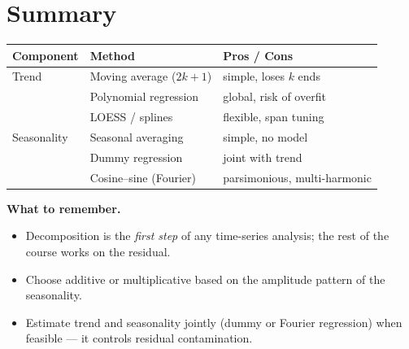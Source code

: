 \section*{Summary}

\begin{center}
\begin{tabular}{lll}
\toprule
\textbf{Component} & \textbf{Method} & \textbf{Pros / Cons} \\
\midrule
Trend       & Moving average ($2k+1$)      & simple, loses $k$ ends \\
            & Polynomial regression        & global, risk of overfit \\
            & LOESS / splines              & flexible, span tuning \\
\midrule
Seasonality & Seasonal averaging           & simple, no model \\
            & Dummy regression             & joint with trend \\
            & Cosine--sine (Fourier)       & parsimonious, multi-harmonic \\
\bottomrule
\end{tabular}
\end{center}

\medskip
\noindent\textbf{What to remember.}
\begin{itemize}
  \item Decomposition is the \emph{first step} of any time-series
        analysis; the rest of the course works on the residual.
  \item Choose additive or multiplicative based on the amplitude
        pattern of the seasonality.
  \item Estimate trend and seasonality jointly (dummy or Fourier
        regression) when feasible — it controls residual contamination.
\end{itemize}
